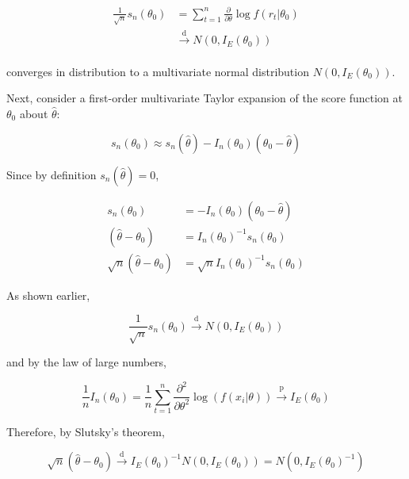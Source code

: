\documentclass{article}
\begin{document}
\[
\begin{split}
 \frac{1}{\sqrt{n}} s_n(\theta_0) &= \sum_{t=1}^n \frac{\partial}{\partial\theta}\log f(r_t | \theta_0) \\ 
 &\xrightarrow[]{\text{d}} N(0, I_E(\theta_0))
\end{split}
\]

converges in distribution to a multivariate normal distribution $N(0, I_E(\theta_0))$.

Next, consider a first-order multivariate Taylor expansion of the score function at $\theta_0$ about $\hat{\theta}$:

\[
s_n(\theta_0) \approx s_n(\hat{\theta}) - I_n(\theta_0) (\theta_0 - \hat{\theta})
\]

Since by definition $s_n(\hat{\theta}) = 0$,

\[
\begin{split}
 s_n(\theta_0) &= - I_n(\theta_0) (\theta_0 - \hat{\theta}) \\
 (\hat{\theta} - \theta_0) &=  I_n(\theta_0)^{-1} s_n(\theta_0) \\
 \sqrt{n}(\hat{\theta} - \theta_0) &=  \sqrt{n} I_n(\theta_0)^{-1} s_n(\theta_0) 
\end{split}
\]

As shown earlier,

\[
\frac{1}{\sqrt{n}} s_n(\theta_0)  \xrightarrow[]{\text{d}} N(0, I_E(\theta_0))
\]

and by the law of large numbers,

\[
\frac{1}{n} I_n(\theta_0) = \frac{1}{n} \sum_{t=1}^n \frac{\partial^2}{\partial\theta^2} \log(f(x_i|\theta))  \xrightarrow[]{\text{p}} I_E(\theta_0)
\]

Therefore, by Slutsky's theorem,

\[
\sqrt{n}(\hat{\theta} - \theta_0) \xrightarrow[]{\text{d}} I_E(\theta_0)^{-1} N(0, I_E(\theta_0)) = N(0, I_E(\theta_0)^{-1})
\]
\end{document}
